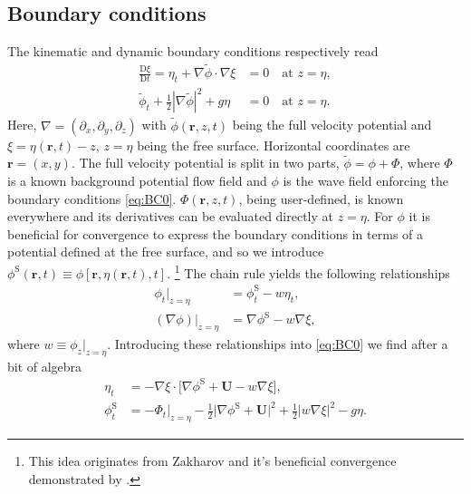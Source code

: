 \documentclass[a4paper,12pt]{article}
\newcommand{\mr}{\mathrm}
\renewcommand{\S}{^\mr{S}}
\newcommand{\phit}{\tilde\phi}
\renewcommand{\_}[1]{_\mr{#1}}
\newcommand{\rr}{\bm r}%
\newcommand{\w}{w}
\newcommand{\bU}{\bm U}
\begin{document}
\subsection{Boundary conditions}
\label{sec:BC}
The kinematic and dynamic boundary conditions respectively read
\begin{subequations}
\begin{align}
\frac{\mr D \xi}{\mr D t}  = \eta_t + \nabla \phit \cdot\nabla \xi &= 0  \quad \text{at }z = \eta, 
\\
\phit_t + \frac12|\nabla\phit|^2 + g\eta &= 0  \quad  \text{at }z = \eta.
\end{align}%
\label{eq:BC0}%
\end{subequations}%
Here, $\nabla=(\partial_x,\partial_y,\partial_z)$  with $\phit(\rr,z,t)$ being the full velocity potential and $\xi = \eta(\rr,t)-z$, $z = \eta$ being the free surface.
Horizontal coordinates are $\rr=(x,y)$.
The full velocity potential is split in two parts, $\phit = \phi + \Phi$, where $\Phi$ is a known background potential flow field and $\phi$ is the wave field enforcing the boundary conditions \eqref{eq:BC0}.
$\Phi(\rr,z,t)$, being user-defined, is known everywhere and its derivatives can be evaluated directly at $z=\eta$.
For $\phi$ it is beneficial for convergence to express the boundary conditions in terms of a potential defined at the free surface, and so we introduce 
$\phi\S(\rr,t) \equiv \phi[\rr,\eta(\rr,t),t]$.%
\footnote{This idea originates from Zakharov and it's beneficial convergence demonstrated by \citet{west1981deep}.}
The chain rule yields the following relationships
\begin{align*}
\phi_t\big|_{z=\eta} &= \phi_t\S - \w\eta_t,\\
(\nabla\phi)\big|_{z=\eta}  &= \nabla\phi\S - \w\nabla\xi , 
\end{align*}
where $\w\equiv \phi_z\big|_{z=\eta}$. 
Introducing these relationships into \eqref{eq:BC0} we find after a bit of algebra
\begin{subequations}
\begin{align}
\eta_t &= - \nabla \xi\cdot\big[\nabla\phi\S + \bU - \w\nabla\xi\big], 
\\
\phi\S_t &= -\Phi_t\big|_{z=\eta} - \frac12\big|\nabla\phi\S + \bU\big|^2 + \frac12|\w\nabla\xi|^2 - g\eta.
\end{align}
\label{eq:BCS}
\end{subequations}
\end{document}
